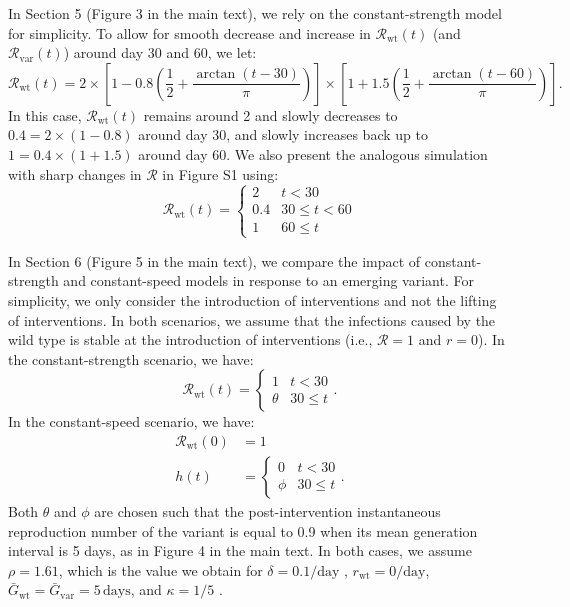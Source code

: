 \documentclass[12pt]{article}
\newcommand{\vvvar}{\mathrm{var}}
\newcommand{\wwwt}{\mathrm{wt}}
\newcommand{\rx}[1]{\ensuremath{{r}_{#1}}\xspace}
\newcommand{\rw}{\rx{\wwwt}}
\newcommand{\Rx}[1]{\ensuremath{{\mathcal R}_{#1}}\xspace}
\newcommand{\RR}{\ensuremath{{\mathcal R}}\xspace}
\newcommand{\Rw}{\Rx{\wwwt}}
\newcommand{\Rv}{\Rx{\vvvar}}
\newcommand{\pday}{\ensuremath{/\textrm{day}}}
\newcommand{\Gx}[1]{\ensuremath{{\bar G}_{#1}}\xspace}
\newcommand{\Gw}{\Gx{\wwwt}}
\newcommand{\Gv}{\Gx{\vvvar}}
\begin{document}
In Section 5 (Figure 3 in the main text), we rely on the constant-strength model for simplicity.
To allow for smooth decrease and increase in $\Rw(t)$ (and $\Rv(t)$) around day 30 and 60, we let:
\begin{equation}
\Rw(t) = 2 \times \left[1 - 0.8 \left(\frac{1}{2} + \frac{\arctan(t-30)}{\pi} \right) \right] \times \left[1 + 1.5 \left(\frac{1}{2} + \frac{\arctan(t-60)}{\pi} \right) \right].
\end{equation}
In this case, $\Rw(t)$ remains around 2 and slowly decreases to $0.4 = 2 \times (1-0.8)$ around day 30, and slowly increases back up to $1 = 0.4 \times (1 + 1.5)$ around day 60.
We also present the analogous simulation with sharp changes in $\RR$ in Figure S1 using:
\begin{equation}
\Rw(t) = \begin{cases}
2 & t < 30\\
0.4 & 30 \leq t < 60\\
1 & 60 \leq t 
\end{cases}
\end{equation}

In Section 6 (Figure 5 in the main text), we compare the impact of constant-strength and constant-speed models in response to an emerging variant.
For simplicity, we only consider the introduction of interventions and not the lifting of interventions.
In both scenarios, we assume that the infections caused by the wild type is stable at the introduction of interventions (i.e., $\RR=1$ and $r=0$).
In the constant-strength scenario, we have: 
\begin{equation}
\Rw(t) = \begin{cases}
1 & t < 30\\
\theta & 30 \leq t
\end{cases}.
\end{equation}
In the constant-speed scenario, we have: 
\begin{align}
\Rw(0) &= 1\\
h(t) &= \begin{cases}
0 & t < 30\\
\phi & 30 \leq t
\end{cases}.
\end{align}
Both $\theta$ and $\phi$ are chosen such that the post-intervention instantaneous reproduction number of the variant is equal to 0.9 when its mean generation interval is 5 days, as in Figure 4 in the main text.
In both cases, we assume $\rho = 1.61$, which is the value we obtain for $\delta=0.1\pday$ \citep{davies2021estimated}, $\rw=0\pday$, $\Gw = \Gv = 5\,\textrm{days}$, and $\kappa = 1/5$ \citep{ferretti2020quantifying}.
\end{document}
